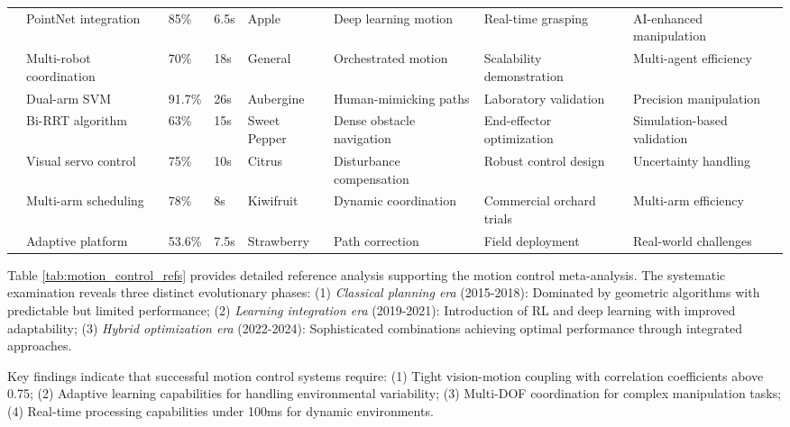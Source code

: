 \documentclass[a4paper,fleqn]{cas-dc}
\begin{document}
\begin{table}[htbp]
\begin{tabular}{p{}p{}p{}p{}p{}p{}p{}p{}}
\cite{kang2020real} & PointNet integration & 85\% & 6.5s & Apple & Deep learning motion & Real-time grasping & AI-enhanced manipulation \\

\cite{vougioukas2019orchestra} & Multi-robot coordination & 70\% & 18s & General & Orchestrated motion & Scalability demonstration & Multi-agent efficiency \\

\cite{sepulveda2020robotic} & Dual-arm SVM & 91.7\% & 26s & Aubergine & Human-mimicking paths & Laboratory validation & Precision manipulation \\

\cite{bac2016analysis} & Bi-RRT algorithm & 63\% & 15s & Sweet Pepper & Dense obstacle navigation & End-effector optimization & Simulation-based validation \\

\cite{mehta2016robust} & Visual servo control & 75\% & 10s & Citrus & Disturbance compensation & Robust control design & Uncertainty handling \\

\cite{williams2019robotic} & Multi-arm scheduling & 78\% & 8s & Kiwifruit & Dynamic coordination & Commercial orchard trials & Multi-arm efficiency \\

\cite{xiong2019development} & Adaptive platform & 53.6\% & 7.5s & Strawberry & Path correction & Field deployment & Real-world challenges \\

\bottomrule
\end{tabular}
\end{table}

Table \ref{tab:motion_control_refs} provides detailed reference analysis supporting the motion control meta-analysis. The systematic examination reveals three distinct evolutionary phases: (1) \textit{Classical planning era} (2015-2018): Dominated by geometric algorithms with predictable but limited performance; (2) \textit{Learning integration era} (2019-2021): Introduction of RL and deep learning with improved adaptability; (3) \textit{Hybrid optimization era} (2022-2024): Sophisticated combinations achieving optimal performance through integrated approaches.

Key findings indicate that successful motion control systems require: (1) Tight vision-motion coupling with correlation coefficients above 0.75; (2) Adaptive learning capabilities for handling environmental variability; (3) Multi-DOF coordination for complex manipulation tasks; (4) Real-time processing capabilities under 100ms for dynamic environments.
\end{document}
